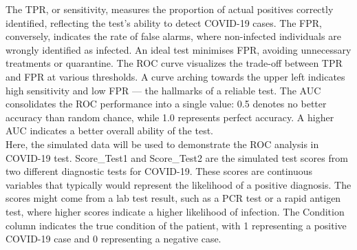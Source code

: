 \documentclass{article}\usepackage[]{graphicx}\usepackage[]{xcolor}
\numberwithin{equation}{section}
\begin{document}
\noindent
The TPR, or sensitivity, measures the proportion of actual positives correctly identified, reflecting the test's ability to detect COVID-19 cases. The FPR, conversely, indicates the rate of false alarms, where non-infected individuals are wrongly identified as infected. An ideal test minimises FPR, avoiding unnecessary treatments or quarantine. The ROC curve visualizes the trade-off between TPR and FPR at various thresholds. A curve arching towards the upper left indicates high sensitivity and low FPR — the hallmarks of a reliable test. The AUC consolidates the ROC performance into a single value: 0.5 denotes no better accuracy than random chance, while 1.0 represents perfect accuracy. A higher AUC indicates a better overall ability of the test.\\

\noindent
Here, the simulated data will be used to demonstrate the ROC analysis in COVID-19 test. Score\_Test1 and Score\_Test2 are the simulated test scores from two different diagnostic tests for COVID-19. These scores are continuous variables that typically would represent the likelihood of a positive diagnosis. The scores might come from a lab test result, such as a PCR test or a rapid antigen test, where higher scores indicate a higher likelihood of infection. The Condition column indicates the true condition of the patient, with 1 representing a positive COVID-19 case and 0 representing a negative case.
\end{document}
